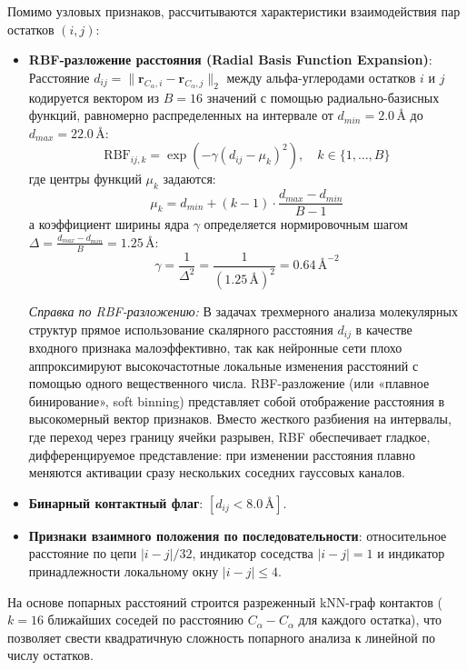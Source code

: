 \documentclass[12pt, a4paper]{article}
\begin{document}
Помимо узловых признаков, рассчитываются характеристики взаимодействия пар остатков $(i, j)$:
\begin{itemize}
    \item \textbf{RBF-разложение расстояния (Radial Basis Function Expansion)}:
    Расстояние $d_{ij} = \|\mathbf{r}_{C_\alpha, i} - \mathbf{r}_{C_\alpha, j}\|_2$ между альфа-углеродами остатков $i$ и $j$ кодируется вектором из $B=16$ значений с помощью радиально-базисных функций, равномерно распределенных на интервале от $d_{min} = 2.0\,\text{\AA}$ до $d_{max} = 22.0\,\text{\AA}$:
    \begin{equation}
        \mathrm{RBF}_{ij, k} = \exp\left(-\gamma (d_{ij} - \mu_k)^2\right), \quad k \in \{1, \dots, B\}
    \end{equation}
    где центры функций $\mu_k$ задаются:
    \begin{equation}
        \mu_k = d_{min} + (k - 1) \cdot \frac{d_{max} - d_{min}}{B - 1}
    \end{equation}
    а коэффициент ширины ядра $\gamma$ определяется нормировочным шагом $\Delta = \frac{d_{max} - d_{min}}{B} = 1.25\,\text{\AA}$:
    \begin{equation}
        \gamma = \frac{1}{\Delta^2} = \frac{1}{(1.25\,\text{\AA})^2} = 0.64\,\text{\AA}^{-2}
    \end{equation}

    \textit{Справка по RBF-разложению:} В задачах трехмерного анализа молекулярных структур прямое использование скалярного расстояния $d_{ij}$ в качестве входного признака малоэффективно, так как нейронные сети плохо аппроксимируют высокочастотные локальные изменения расстояний с помощью одного вещественного числа. RBF-разложение (или «плавное бинирование», soft binning) представляет собой отображение расстояния в высокомерный вектор признаков. Вместо жесткого разбиения на интервалы, где переход через границу ячейки разрывен, RBF обеспечивает гладкое, дифференцируемое представление: при изменении расстояния плавно меняются активации сразу нескольких соседних гауссовых каналов.
    \item \textbf{Бинарный контактный флаг}: $[d_{ij} < 8.0\,\text{\AA}]$.
    \item \textbf{Признаки взаимного положения по последовательности}: относительное расстояние по цепи $|i-j| / 32$, индикатор соседства $|i-j|=1$ и индикатор принадлежности локальному окну $|i-j| \le 4$.
\end{itemize}
На основе попарных расстояний строится разреженный kNN-граф контактов ($k=16$ ближайших соседей по расстоянию $C_\alpha - C_\alpha$ для каждого остатка), что позволяет свести квадратичную сложность попарного анализа к линейной по числу остатков.
\end{document}
